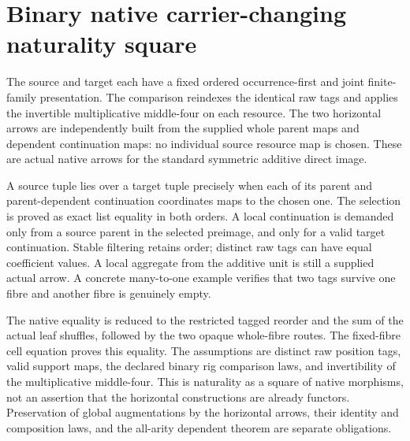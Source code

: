 \documentclass{article}
\begin{document}
\section*{Binary native carrier-changing naturality square}
The source and target each have a fixed ordered occurrence-first
and joint finite-family presentation. The comparison reindexes the
identical raw tags and applies the invertible multiplicative middle-four
on each resource. The two horizontal arrows are independently built
from the supplied whole parent maps and dependent continuation maps:
no individual source resource map is chosen. These are actual native
arrows for the standard symmetric additive direct image.

A source tuple lies over a target tuple precisely when each of its
parent and parent-dependent continuation coordinates maps to the
chosen one. The selection is proved as exact list equality in both
orders. A local continuation is demanded only from a source parent
in the selected preimage, and only for a valid target continuation.
Stable filtering retains order; distinct raw tags can have equal
coefficient values. A local aggregate from the additive unit is still
a supplied actual arrow. A concrete many-to-one example verifies
that two tags survive one fibre and another fibre is genuinely empty.

The native equality is reduced to the restricted tagged reorder and
the sum of the actual leaf shuffles, followed by the two opaque
whole-fibre routes. The fixed-fibre cell equation proves this equality.
The assumptions are distinct raw position tags, valid support maps,
the declared binary rig comparison laws, and invertibility of the
multiplicative middle-four. This is naturality as a square of native
morphisms, not an assertion that the horizontal constructions are
already functors. Preservation of global augmentations by the
horizontal arrows, their identity and composition laws, and the
all-arity dependent theorem are separate obligations.
\end{document}

